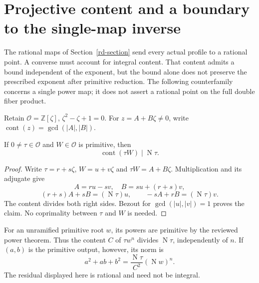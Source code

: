 \section{Projective content and a boundary to the single-map inverse}
\label{pc-section}

The rational maps of Section~\ref{rd-section} send every actual profile
to a rational point. A converse must account for integral content.
That content admits a bound independent of the exponent, but the bound
alone does not preserve the prescribed exponent after primitive reduction.
The following counterfamily concerns a single power map; it does not
assert a rational point on the full double fiber product.

Retain $\mathcal O=\mathbb Z[\zeta]$, $\zeta^2-\zeta+1=0$.
For $z=A+B\zeta\ne0$, write
$\operatorname{cont}(z)=\gcd(|A|,|B|)$.

\begin{lemma}\label{pc-content}
If $0\ne\tau\in\mathcal O$ and $W\in\mathcal O$ is primitive, then
\[
 \operatorname{cont}(\tau W)\mid\operatorname N\tau.
\]
\end{lemma}
\begin{proof}
Write $\tau=r+s\zeta$, $W=u+v\zeta$ and $\tau W=A+B\zeta$.
Multiplication and its adjugate give
\[
 A=ru-sv,\quad B=su+(r+s)v,
\]
\[
 (r+s)A+sB=(\operatorname N\tau)u,\qquad
 -sA+rB=(\operatorname N\tau)v.
\]
The content divides both right sides. Bezout for $\gcd(|u|,|v|)=1$
proves the claim. No coprimality between $\tau$ and $W$ is needed.
\end{proof}

For an unramified primitive root $w$, its powers are primitive by the
reviewed power theorem. Thus the content $C$ of $\tau w^n$ divides
$\operatorname N\tau$, independently of $n$. If $(a,b)$ is the
primitive output, however, its norm is
\begin{equation}\label{pc-reduced-norm}
 a^2+ab+b^2=\frac{\operatorname N\tau}{C^2}
                         (\operatorname Nw)^n.
\end{equation}
The residual displayed here is rational and need not be integral.


